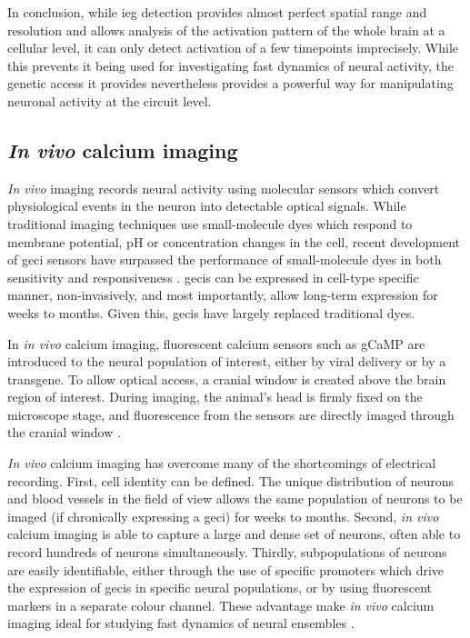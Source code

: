 In conclusion, while \gls{ieg} detection provides almost perfect spatial range and resolution and allows analysis of the activation pattern of the whole brain at a cellular level, it can only detect activation of a few timepoints imprecisely. While this prevents it being used for investigating fast dynamics of neural activity, the genetic access it provides nevertheless provides a powerful way for manipulating neuronal activity at the circuit level.


\subsection{\textit{In vivo} calcium imaging}

\textit{In vivo} imaging records neural activity using molecular sensors which convert physiological events in the neuron into detectable optical signals. While traditional imaging techniques use small-molecule dyes which respond to membrane potential, pH or  concentration changes in the cell, recent development of \gls{geci}  sensors have surpassed the performance of small-molecule  dyes in both sensitivity and responsiveness \citep{lutcke13}. \Glspl{geci} can be expressed in cell-type specific manner, non-invasively, and most importantly, allow long-term expression for weeks to months. Given this, \glspl{geci} have largely replaced traditional dyes. 

In \textit{in vivo} calcium imaging, fluorescent calcium sensors such as gCaMP  are introduced to the neural population of interest, either by viral delivery or by a transgene. To allow optical access, a cranial window is created above the brain region of interest. During imaging, the animal's head is firmly fixed on the microscope stage, and fluorescence from the sensors are directly imaged through the cranial window \citep{lutcke13, yang17}. 

\textit{In vivo} calcium imaging has overcome many of the shortcomings of electrical recording. First, cell identity can be defined. The unique distribution of neurons and blood vessels in the field of view allows the same population of neurons to be imaged (if chronically expressing a \gls{geci}) for weeks to months. Second, \textit{in vivo} calcium imaging is able to capture a large and dense set of neurons, often able to record hundreds of neurons simultaneously. Thirdly, subpopulations of neurons are easily identifiable, either through the use of specific promoters which drive the expression of \glspl{geci} in specific neural populations, or by using fluorescent markers in a separate colour channel. These advantage make \textit{in vivo} calcium imaging ideal for studying fast dynamics of neural ensembles \citep{lutcke13}. 

